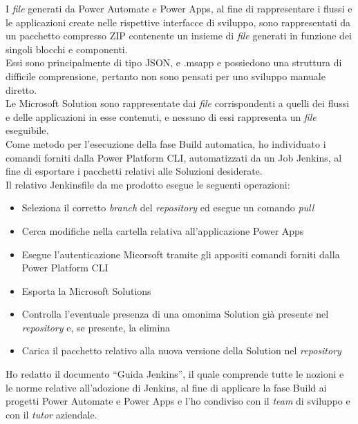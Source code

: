 I \emph{file} generati da Power Automate e Power Apps, al fine di rappresentare i flussi e le applicazioni create nelle rispettive interfacce di sviluppo, sono rappresentati da un pacchetto compresso ZIP contenente un insieme di \emph{file} generati in funzione dei singoli blocchi e componenti.\\
Essi sono principalmente di tipo JSON, e .msapp e possiedono una struttura di difficile comprensione, pertanto non sono pensati per uno sviluppo manuale diretto.\\
Le Microsoft Solution sono rappresentate dai \emph{file} corrispondenti a quelli dei flussi e delle applicazioni in esse contenuti, e nessuno di essi rappresenta un \emph{file} eseguibile.\\
Come metodo per l'esecuzione della fase Build automatica, ho individuato i comandi forniti dalla Power Platform CLI, automatizzati da un Job Jenkins, al fine di esportare i pacchetti relativi alle Soluzioni desiderate.\\
Il relativo Jenkinsfile da me prodotto esegue le seguenti operazioni:
\begin{itemize}
    \item Seleziona il corretto \emph{branch} del \emph{repository} ed esegue un comando \emph{pull}
    \item Cerca modifiche nella cartella relativa all'applicazione Power Apps
    \item Esegue l'autenticazione Micorsoft tramite gli appositi comandi forniti dalla Power Platform CLI
    \item Esporta la Microsoft Solutions
    \item Controlla l'eventuale presenza di una omonima Solution già presente nel \emph{repository} e, se presente, la elimina 
    \item Carica il pacchetto relativo alla nuova versione della Solution nel \emph{repository}
\end{itemize}
Ho redatto il documento “Guida Jenkins”, il quale comprende tutte le nozioni e le norme relative all'adozione di Jenkins, al fine di applicare la fase Build ai progetti Power Automate e Power Apps e l'ho condiviso con il \emph{team} di sviluppo e con il \emph{\emph{tutor}} aziendale.


